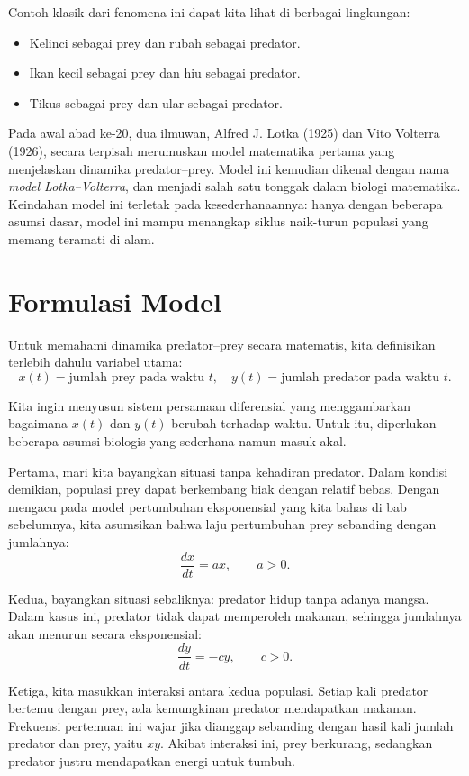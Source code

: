 \documentclass{bukumjh}
\begin{document}
Contoh klasik dari fenomena ini dapat kita lihat di berbagai lingkungan:
\begin{itemize}
    \item Kelinci sebagai prey dan rubah sebagai predator.
    \item Ikan kecil sebagai prey dan hiu sebagai predator.
    \item Tikus sebagai prey dan ular sebagai predator.
\end{itemize}

Pada awal abad ke-20, dua ilmuwan, Alfred J. Lotka (1925) dan Vito Volterra (1926), secara terpisah merumuskan model matematika pertama yang menjelaskan dinamika predator–prey. Model ini kemudian dikenal dengan nama \textit{model Lotka–Volterra}, dan menjadi salah satu tonggak dalam biologi matematika. Keindahan model ini terletak pada kesederhanaannya: hanya dengan beberapa asumsi dasar, model ini mampu menangkap siklus naik-turun populasi yang memang teramati di alam.

\section{Formulasi Model}

Untuk memahami dinamika predator–prey secara matematis, kita definisikan terlebih dahulu variabel utama:
%
\[
x(t) = \text{jumlah prey pada waktu } t, \quad 
y(t) = \text{jumlah predator pada waktu } t.
\]

Kita ingin menyusun sistem persamaan diferensial yang menggambarkan bagaimana $x(t)$ dan $y(t)$ berubah terhadap waktu. Untuk itu, diperlukan beberapa asumsi biologis yang sederhana namun masuk akal.

Pertama, mari kita bayangkan situasi tanpa kehadiran predator. Dalam kondisi demikian, populasi prey dapat berkembang biak dengan relatif bebas. Dengan mengacu pada model pertumbuhan eksponensial yang kita bahas di bab sebelumnya, kita asumsikan bahwa laju pertumbuhan prey sebanding dengan jumlahnya:
\[
\frac{dx}{dt} = ax, \qquad a > 0.
\]

Kedua, bayangkan situasi sebaliknya: predator hidup tanpa adanya mangsa. Dalam kasus ini, predator tidak dapat memperoleh makanan, sehingga jumlahnya akan menurun secara eksponensial:
\[
\frac{dy}{dt} = -cy, \qquad c > 0.
\]

Ketiga, kita masukkan interaksi antara kedua populasi. Setiap kali predator bertemu dengan prey, ada kemungkinan predator mendapatkan makanan. Frekuensi pertemuan ini wajar jika dianggap sebanding dengan hasil kali jumlah predator dan prey, yaitu $xy$. Akibat interaksi ini, prey berkurang, sedangkan predator justru mendapatkan energi untuk tumbuh.
\end{document}

